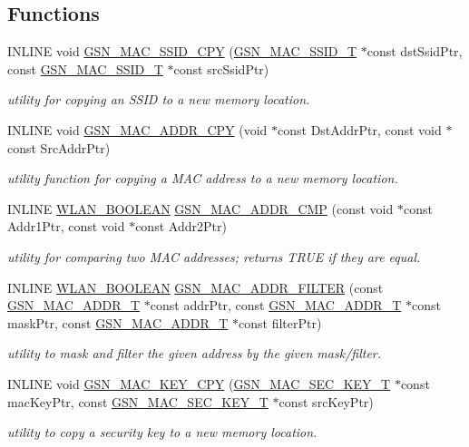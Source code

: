 \subsection*{Functions}
\begin{DoxyCompactItemize}
\item 
INLINE void \hyperlink{a00642_ga41c43127ce1f76a9d59782ea41e71936}{GSN\_\-MAC\_\-SSID\_\-CPY} (\hyperlink{a00417}{GSN\_\-MAC\_\-SSID\_\-T} $\ast$const dstSsidPtr, const \hyperlink{a00417}{GSN\_\-MAC\_\-SSID\_\-T} $\ast$const srcSsidPtr)
\begin{DoxyCompactList}\small\item\em utility for copying an SSID to a new memory location. \end{DoxyCompactList}\item 
INLINE void \hyperlink{a00642_ga10d1d894fd6997657ba3ad3feb3f5c25}{GSN\_\-MAC\_\-ADDR\_\-CPY} (void $\ast$const DstAddrPtr, const void $\ast$const SrcAddrPtr)
\begin{DoxyCompactList}\small\item\em utility function for copying a MAC address to a new memory location. \end{DoxyCompactList}\item 
INLINE \hyperlink{a00642_ga7fb691c78d3a1046fa998bae1560e1a5}{WLAN\_\-BOOLEAN} \hyperlink{a00642_ga40777d8fbdd030789a57dff0bd8ff0f0}{GSN\_\-MAC\_\-ADDR\_\-CMP} (const void $\ast$const Addr1Ptr, const void $\ast$const Addr2Ptr)
\begin{DoxyCompactList}\small\item\em utility for comparing two MAC addresses; returns TRUE if they are equal. \end{DoxyCompactList}\item 
INLINE \hyperlink{a00642_ga7fb691c78d3a1046fa998bae1560e1a5}{WLAN\_\-BOOLEAN} \hyperlink{a00642_ga41a9a0ac53be9509c53d788c7f441f11}{GSN\_\-MAC\_\-ADDR\_\-FILTER} (const \hyperlink{a00416}{GSN\_\-MAC\_\-ADDR\_\-T} $\ast$const addrPtr, const \hyperlink{a00416}{GSN\_\-MAC\_\-ADDR\_\-T} $\ast$const maskPtr, const \hyperlink{a00416}{GSN\_\-MAC\_\-ADDR\_\-T} $\ast$const filterPtr)
\begin{DoxyCompactList}\small\item\em utility to mask and filter the given address by the given mask/filter. \end{DoxyCompactList}\item 
INLINE void \hyperlink{a00642_gad5c339a4bdf8153b8db53bb5b3437cce}{GSN\_\-MAC\_\-KEY\_\-CPY} (\hyperlink{a00131}{GSN\_\-MAC\_\-SEC\_\-KEY\_\-T} $\ast$const macKeyPtr, const \hyperlink{a00131}{GSN\_\-MAC\_\-SEC\_\-KEY\_\-T} $\ast$const srcKeyPtr)
\begin{DoxyCompactList}\small\item\em utility to copy a security key to a new memory location. \end{DoxyCompactList}\end{DoxyCompactItemize}
